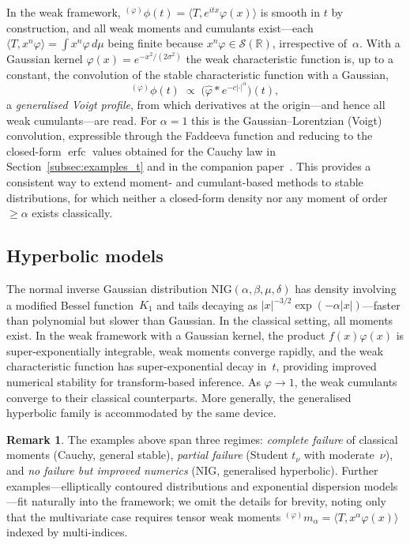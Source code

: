 \documentclass[12pt]{article}
\theoremstyle{definition}
\newtheorem{remark}[theorem]{Remark}
\newcommand{\R}{\mathbb{R}}
\begin{document}
In the weak framework, ${}^{(\varphi)}\phi(t) = \langle T, e^{itx}\varphi(x)\rangle$ is smooth in $t$ by construction, and all weak moments and cumulants exist---each $\langle T,x^n\varphi\rangle=\int x^n\varphi\,d\mu$ being finite because $x^n\varphi\in\mathcal{S}(\R)$, irrespective of~$\alpha$.  With a Gaussian kernel $\varphi(x)=e^{-x^2/(2\sigma^2)}$ the weak characteristic function is, up to a constant, the convolution of the stable characteristic function with a Gaussian,
\[
   {}^{(\varphi)}\phi(t)\;\propto\;\bigl(\widehat{\varphi}\ast e^{-c|\cdot|^{\alpha}}\bigr)(t),
\]
a \emph{generalised Voigt profile}, from which derivatives at the origin---and hence all weak cumulants---are read.  For $\alpha=1$ this is the Gaussian--Lorentzian (Voigt) convolution, expressible through the Faddeeva function and reducing to the closed-form $\operatorname{erfc}$ values obtained for the Cauchy law in Section~\ref{subsec:examples_t} and in the companion paper~\cite{LabouriauA2}.  This provides a consistent way to extend moment- and cumulant-based methods to stable distributions, for which neither a closed-form density nor any moment of order $\ge\alpha$ exists classically.

\subsection{Hyperbolic models}
\label{subsec:examples_hyperbolic}

The normal inverse Gaussian distribution $\mathrm{NIG}(\alpha,\beta,\mu,\delta)$ has density involving a modified Bessel function~$K_1$ and tails decaying as $|x|^{-3/2}\exp(-\alpha|x|)$---faster than polynomial but slower than Gaussian.  In the classical setting, all moments exist.  In the weak framework with a Gaussian kernel, the product $f(x)\varphi(x)$ is super-exponentially integrable, weak moments converge rapidly, and the weak characteristic function has super-exponential decay in~$t$, providing improved numerical stability for transform-based inference.  As $\varphi\to 1$, the weak cumulants converge to their classical counterparts.  More generally, the generalised hyperbolic family is accommodated by the same device.

\begin{remark}
The examples above span three regimes: \emph{complete failure} of classical moments (Cauchy, general stable), \emph{partial failure} (Student $t_\nu$ with moderate~$\nu$), and \emph{no failure but improved numerics} (NIG, generalised hyperbolic).  Further examples---elliptically contoured distributions and exponential dispersion models---fit naturally into the framework; we omit the details for brevity, noting only that the multivariate case requires tensor weak moments ${}^{(\varphi)}m_\alpha = \langle T, x^\alpha\varphi(x)\rangle$ indexed by multi-indices.
\end{remark}
\end{document}
